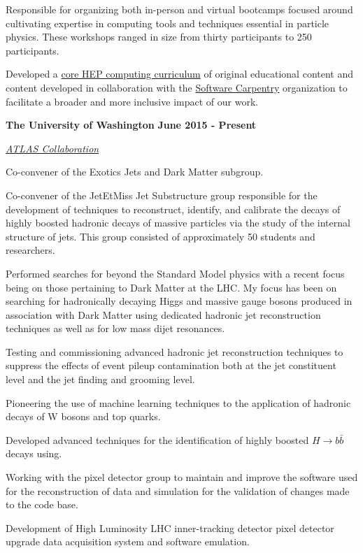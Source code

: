 \documentclass[10pt]{article}
\newenvironment{outerlist}[1][\enskip\textbullet]%
        {\begin{itemize}[#1]}{\end{itemize}%
         \vspace{-.6\baselineskip}}
\newenvironment{innerlist}[1][\enskip\textbullet]%
        {\begin{compactitem}[#1]}{\end{compactitem}}
\begin{document}
\begin{outerlist}
\begin{innerlist}
            \item Responsible for organizing both in-person and virtual bootcamps focused around cultivating expertise in computing tools and techniques essential in particle physics.  These workshops ranged in size from thirty participants to 250 participants. 
            \item Developed a \href{https://hepsoftwarefoundation.org/training/curriculum.html}{core HEP computing curriculum} of original educational content and content developed in collaboration with the \href{https://software-carpentry.org/}{Software Carpentry} organization to facilitate a broader and more inclusive impact of our work.
            \end{innerlist}
\end{outerlist}

\vspace{3mm}

\textbf{The University of Washington}    \hfill \textbf{June 2015 - Present}
\begin{outerlist}
\item[] \textit{\href{https://atlas.cern/}{ATLAS Collaboration}}%
        \begin{innerlist}
            \item Co-convener of the Exotics Jets and Dark Matter subgroup.
            \item Co-convener of the JetEtMiss Jet Substructure group responsible for the development of techniques to reconstruct, identify, and calibrate the decays of highly boosted hadronic decays of massive particles via the study of the internal structure of jets.  This group consisted of approximately 50 students and researchers.
            \item Performed searches for beyond the Standard Model physics with a recent focus being on those pertaining to Dark Matter at the LHC.  My focus has been on searching for hadronically decaying Higgs and massive gauge bosons produced in association with Dark Matter using dedicated hadronic jet reconstruction techniques as well as for low mass dijet resonances.
	   \item Testing and commissioning advanced hadronic jet reconstruction techniques to suppress the effects of event pileup contamination both at the jet constituent level and the jet finding and grooming level.  
            \item Pioneering the use of machine learning techniques to the application of hadronic decays of W bosons and top quarks.
            \item Developed advanced techniques for the identification of highly boosted $H\rightarrow b\bar{b}$ decays using.
            \item Working with the pixel detector group to maintain and improve the software used for the reconstruction of data and simulation for the validation of changes made to the code base.
            \item Development of High Luminosity LHC inner-tracking detector pixel detector upgrade data acquisition system and software emulation.
        \end{innerlist}
\end{outerlist}
\end{document}
